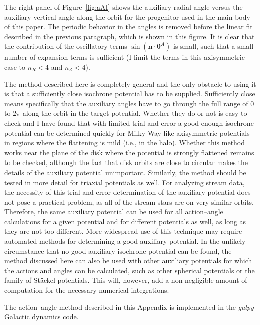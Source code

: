 \documentclass{emulateapj}
\newcommand{\ie}{i.e.}
\renewcommand{\figurename}{Figure}
\renewcommand{\vec}[1]{\ensuremath{\mathbf{#1}}}
\newcommand{\vecn}{\ensuremath{\vec{n}}}
\newcommand{\veca}{\ensuremath{\boldsymbol\theta}}
\begin{document}
The right panel of \figurename~\ref{fig:aAI} shows the auxiliary
radial angle versus the auxiliary vertical angle along the orbit for
the progenitor used in the main body of this paper. The periodic
behavior in the angles is removed before the linear fit described in
the previous paragraph, which is shown in this figure. It is clear
that the contribution of the oscillatory terms
$\sin(\vecn\cdot\veca^A)$ is small, such that a small number of
expansion terms is sufficient (I limit the terms in this axisymmetric
case to $n_R < 4$ and $n_Z < 4$).

The method described here is completely general and the only obstacle
to using it is that a sufficiently close isochrone potential has to be
supplied. Sufficiently close means specifically that the auxiliary
angles have to go through the full range of $0$ to $2\pi$ along the
orbit in the target potential. Whether they do or not is easy to check
and I have found that with limited trial and error a good enough
isochrone potential can be determined quickly for Milky-Way-like
axisymmetric potentials in regions where the flattening is mild (\ie,
in the halo). Whether this method works near the plane of the disk
where the potential is strongly flattened remains to be checked,
although the fact that disk orbits are close to circular makes the
details of the auxiliary potential unimportant. Similarly, the method
should be tested in more detail for triaxial potentials as well. For
analyzing stream data, the necessity of this trial-and-error
determination of the auxiliary potential does not pose a practical
problem, as all of the stream stars are on very similar
orbits. Therefore, the same auxiliary potential can be used for all
action--angle calculations for a given potential and for different
potentials as well, as long as they are not too different. More
widespread use of this technique may require automated methods for
determining a good auxiliary potential. In the unlikely circumstance
that no good auxiliary isochrone potential can be found, the method
discussed here can also be used with other auxiliary potentials for
which the actions and angles can be calculated, such as other
spherical potentials or the family of St\"{a}ckel potentials. This
will, however, add a non-negligible amount of computation for the
necessary numerical integrations.

The action--angle method described in this Appendix is implemented in
the \emph{galpy} Galactic dynamics code.

\end{document}
